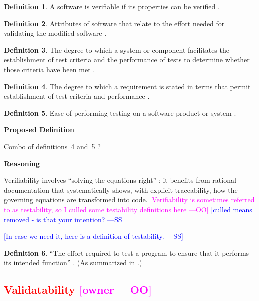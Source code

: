 \documentclass[letterpaper,cleveref]{lipics-v2019}
\newcommand{\authornote}[3]{\textcolor{#1}{[#3 ---#2]}}
\newcommand{\authornote}[3]{}
\newcommand{\wss}[1]{\authornote{blue}{SS}{#1}} %
\newcommand{\oo}[1]{\authornote{magenta}{OO}{#1}} %
\newcommand{\notdone}[1]{\textcolor{red}{#1}}
\theoremstyle{definition}
\newtheorem{defn}{Definition}
\begin{document}
\begin{defn}
  A software is verifiable if its properties can be verified
  \citep{GhezziEtAl2003}.
\end{defn}

\begin{defn}
  Attributes of software that relate to the effort needed for validating the
  modified software \citep{berander2005software}.
\end{defn}

\begin{defn}
  The degree to which a system or component facilitates the establishment of
  test criteria and the performance of tests to determine whether those criteria
  have been met \citep{IEEEStdGlossarySET1990}.
\end{defn}

\begin{defn} \label{Defn_Verifiability1}
  The degree to which a requirement is stated in terms that permit establishment
  of test criteria and performance \citep{IEEEStdGlossarySET1990}.
\end{defn}

\begin{defn} \label{Defn_Verifiability2}
  Ease of performing testing on a software product or system
  \citep{IEEEStdGlossarySET1990}.
\end{defn}

\noindent \textbf{Proposed Definition}

Combo of definitions~\ref{Defn_Verifiability1} and~\ref{Defn_Verifiability2} ?

\noindent \textbf{Reasoning}

Verifiability involves ``solving the equations right'' \citep[p.~23]{Roache1998};
it benefits from rational documentation that systematically shows, with explicit
traceability, how the governing equations are transformed into code.
\oo{Verifiability is sometimes referred to as testability, so I culled some
  testability definitions here}  \wss{culled means removed - is that your
  intention?}

\wss{In case we need it, here is a definition of testability.}

\begin{defn}
  ``The effort required to test a program to ensure that it performs its
  intended function'' \citep{McCallEtAl1977}. (As summarized in
  \citet{VanVliet2000}.)
\end{defn}


\subsection{\notdone{Validatability} \oo{owner}}
\end{document}
